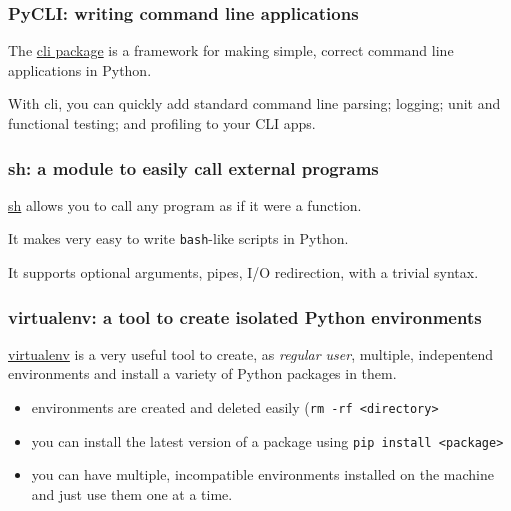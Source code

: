 \documentclass[english,serif,mathserif,xcolor=pdftex,dvipsnames,table]{beamer}
\begin{document}
\begin{frame}
  \frametitle{PyCLI: writing command line applications}

  The \href{https://pypi.python.org/pypi/pyCLI}{cli package} is a
  framework for making simple, correct command line applications in
  Python.

  \+
  With cli, you can quickly add standard command line parsing;
  logging; unit and functional testing; and profiling to your CLI
  apps.
\end{frame}


\begin{frame}
  \frametitle{sh: a module to easily call external programs}

  \href{http://amoffat.github.com/sh/}{sh} allows you to call any
  program as if it were a function.

  \+

  It makes very easy to write \texttt{bash}-like scripts in Python.

  \+

  It supports optional arguments, pipes, I/O redirection, with a
  trivial syntax.
\end{frame}

\begin{frame}
  \frametitle{virtualenv: a tool to create isolated Python environments}

  \href{https://pypi.python.org/pypi/virtualenv}{virtualenv} is a very
  useful tool to create, as \textit{regular user}, multiple,
  indepentend environments and install a variety of Python packages in
  them.

  \begin{itemize}
  \item environments are created and deleted easily (\texttt{rm -rf <directory>}
  \item you can install the latest version of a package using
    \texttt{pip install <package>}
  \item you can have multiple, incompatible environments installed on
    the machine and just use them one at a time.
  \end{itemize}
\end{frame}
\end{document}

